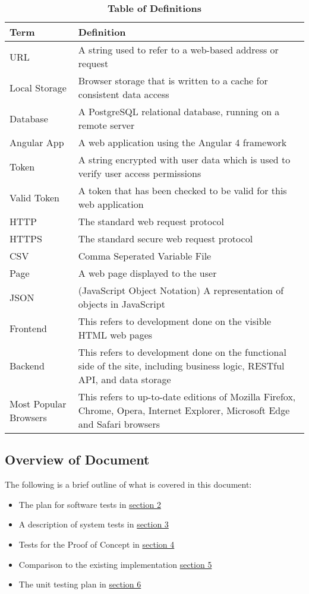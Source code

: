 \documentclass[12pt, titlepage]{article}
\begin{document}
\begin{table}[!ht]
\caption{\textbf{Table of Definitions}} \label{table:def}

\begin{tabularx}{\textwidth}{p{3cm}X}
\toprule
\textbf{Term} & \textbf{Definition}\\
\midrule
URL & A string used to refer to a web-based address or request \\
Local Storage & Browser storage that is written to a cache for consistent data access \\
Database & A PostgreSQL relational database, running on a remote server \\
Angular App & A web application using the Angular 4 framework \\
Token & A string encrypted with user data which is used to verify user access permissions \\
Valid Token & A token that has been checked to be valid for this web application \\
HTTP & The standard web request protocol \\
HTTPS & The standard secure web request protocol \\
CSV & Comma Seperated Variable File\\
Page & A web page displayed to the user \\
JSON & (JavaScript Object Notation) A representation of objects in JavaScript \\
Frontend & This refers to development done on the visible HTML web pages \\
Backend & This refers to development done on the functional side of the site, including business logic, RESTful API, and data storage \\
Most Popular Browsers & This refers to up-to-date editions of Mozilla Firefox, Chrome, Opera, Internet Explorer, Microsoft Edge and Safari browsers \\
\bottomrule
\end{tabularx}

\end{table}	

\subsection{Overview of Document}
The following is a brief outline of what is covered in this document:
\begin{itemize}
    \item The plan for software tests in \hyperref[sec:plan]{section 2}
    \item A description of system tests in \hyperref[sec:system]{section 3}
    \item Tests for the Proof of Concept in \hyperref[sec:poc]{section 4}
    \item Comparison to the existing implementation \hyperref[sec:exist]{section 5}
    \item The unit testing plan in \hyperref[sec:unit]{section 6}
\end{itemize}
\end{document}
